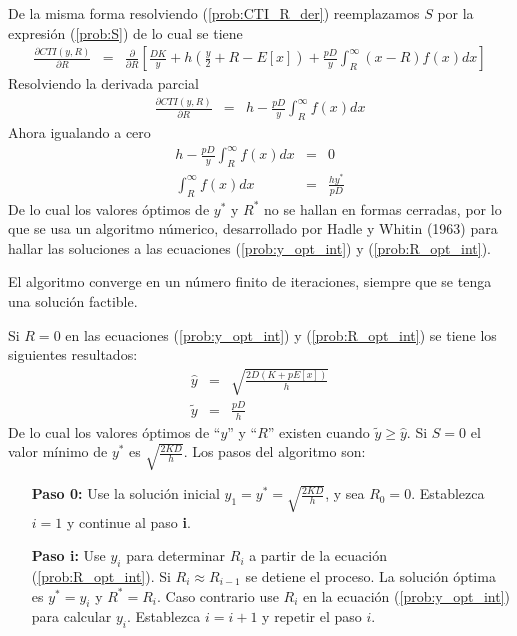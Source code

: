 De la misma forma resolviendo (\ref{prob:CTI_R_der}) reemplazamos $S$ por la expresión (\ref{prob:S}) de lo cual se tiene
\begin{eqnarray}
	\frac{\partial CTI(y,R)}{\partial R} &=& \frac{\partial}{\partial R} \left[\frac{DK}{y} + h \left(\frac{y}{2} + R - E[x] \right) + \frac{pD}{y} \int_{R}^{\infty} (x-R)f(x)dx \right] \nonumber
\end{eqnarray}
Resolviendo la derivada parcial 
\begin{eqnarray}
	\frac{\partial CTI(y,R)}{\partial R} &=& h - \frac{pD}{y}\int_{R}^{\infty} f(x)dx \nonumber
\end{eqnarray}
Ahora igualando a cero
\begin{eqnarray}
	\label{prob:R_opt_int}
	h - \frac{pD}{y}\int_{R}^{\infty} f(x)dx &=& 0 \nonumber \\
	\int_{R}^{\infty} f(x)dx &=& \frac{hy^*}{pD}
\end{eqnarray}
De lo cual los valores óptimos de $y^*$ y $R^*$ no se hallan en formas cerradas, por lo que se usa un algoritmo númerico, desarrollado por Hadle y Whitin (1963) para hallar las soluciones a las ecuaciones (\ref{prob:y_opt_int}) y (\ref{prob:R_opt_int}).

El algoritmo converge en un número finito de iteraciones, siempre que se tenga una solución factible.

Si $R=0$ en las ecuaciones (\ref{prob:y_opt_int}) y (\ref{prob:R_opt_int}) se tiene los siguientes resultados:
\begin{eqnarray}
	\hat{y} &=& \sqrt{\frac{2D(K+pE[x])}{h}} \nonumber \\
	\tilde{y} &=& \frac{pD}{h} \nonumber
\end{eqnarray}
De lo cual los valores óptimos de ``$y$'' y ``$R$'' existen cuando $\tilde{y} \geq \hat{y}$. Si $S=0$ el valor mínimo de $y^*$ es $\sqrt{\frac{2KD}{h}}$. Los pasos del algoritmo son:
\begin{itemize}
	\item[\textbf{Paso 0:}] Use la solución inicial ${y}_{1} = y^* = \sqrt{\frac{2KD}{h}}$, y sea ${R}_{0} = 0$. Establezca $i = 1$ y continue al paso \textbf{i}.
	\item[\textbf{Paso i:}] Use ${y}_{i}$ para determinar ${R}_{i}$ a partir de la ecuación (\ref{prob:R_opt_int}). Si ${R}_{i} \approx {R}_{i-1}$ se detiene el proceso. La solución óptima es $y^* = y_{i}$ y $R^* = R_{i}$. Caso contrario use ${R}_{i}$ en la ecuación (\ref{prob:y_opt_int}) para calcular ${y}_{i}$. Establezca $i = i +1$ y repetir el paso $i$.
\end{itemize}

